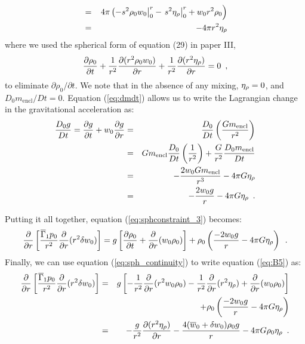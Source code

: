 \begin{enumerate}
\begin{description}
\begin{eqnarray}
&=&  \left . 4\pi \left(-s^2 \rho_0 w_0 \right |_0^r - \left . s^2 \eta_{\rho} \right |_0^r + w_0 r^2 \rho_0 \right) \nonumber \\
&=& -4\pi r^2 \eta_{\rho} \label{eq:dmdt}
\end{eqnarray}
where we used the spherical form of equation (29) in paper III, 
\begin{equation}
\label{eq:sph_continuity}
\frac{\partial \rho_0}{\partial t} + \frac{1}{r^2} \frac{\partial (r^2 \rho_0 w_0)}{\partial r} 
+ \frac{1}{r^2} \frac{\partial (r^2 \eta_{\rho} )}{\partial r}  = 0 \enskip ,
\end{equation}
to eliminate $\partial \rho_0/\partial t$.  We note that in the
absence of any mixing, $\eta_{\rho}=0$, and  $D_0 m_\mathrm{encl}/Dt = 0.$
Equation (\ref{eq:dmdt})
allows us to write the Lagrangian change in the gravitational
acceleration as:
\begin{eqnarray}
\frac{D_0 g}{D t} = \frac{\partial g}{\partial t} + w_0 \frac{\partial g}{\partial r} &=& \frac{D_0}{Dt}\left(\frac{G m_\mathrm{encl}}{r^2}\right) \nonumber \\
&=& G m_\mathrm{encl}\frac{D_0}{D t}\left(\frac{1}{r^2}\right) + \frac{G}{r^2}\frac{D_0 m_\mathrm{encl}}{Dt} \nonumber \\
&=& -\frac{2 w_0 G m_\mathrm{encl}}{r^3} - 4 \pi G \eta_{\rho} \nonumber \\
&=& -\frac{2 w_0 g}{r} - 4 \pi G \eta_{\rho} \enskip .
\end{eqnarray}

Putting it all together, equation (\ref{eq:sphconstraint_3}) becomes:
\begin{equation}
 \frac{\partial}{\partial r} \left[ \frac{\overline{\Gamma}_1 p_0}{r^2} \frac{\partial}{\partial r} (r^2 \delta w_0) \right] 
= 
  g \left [ \frac{\partial \rho_0}{\partial t} + \frac{\partial}{\partial r} (w_0 \rho_0) \right ]
+ \rho_0 \left(\frac{-2 w_0 g}{r} - 4 \pi G \eta_{\rho} \right) \label{eq:B5} \enskip.
\end{equation}
Finally, we can use equation (\ref{eq:sph_continuity})
to write equation (\ref{eq:B5}) as:
\begin{eqnarray}
\frac{\partial}{\partial r} \left[ \frac{\overline{\Gamma}_1 p_0}{r^2} \frac{\partial}{\partial r} (r^2 \delta w_0) \right] &=&
 g \left [ -\frac{1}{r^2} \frac{\partial}{\partial r} (r^2 w_0 \rho_0)
           -\frac{1}{r^2} \frac{\partial}{\partial r} (r^2 \eta_{\rho})
           + \frac{\partial}{\partial r} (w_0 \rho_0) \right ] \nonumber \\
&& + \rho_0 \left(\frac{-2 w_0 g}{r} - 4 \pi G \eta_{\rho} \right) \nonumber \\
&=& - \frac{g}{r^2} \frac{\partial (r^2 \eta_{\rho})}{\partial r} 
- \frac{4 (\overline{w}_0 + \delta w_0) \rho_0 g}{r} - 4 \pi G \rho_0 \eta_{\rho} \label{eq:B7} \enskip .
\end{eqnarray}


\end{description}
\end{enumerate}
